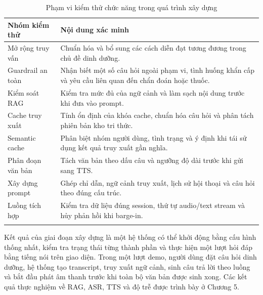 \documentclass[a4paper,13pt,twoside]{report}
\begin{document}
\begingroup
\small
\renewcommand{\arraystretch}{1.05}
\setlength{\LTleft}{\fill}
\setlength{\LTright}{\fill}
\begin{longtable}{|p{4.0cm}|p{8.5cm}|}
    \hline
    \textbf{Nhóm kiểm thử} & \textbf{Nội dung xác minh}                                                                                 \\
    \hline
    Mở rộng truy vấn       & Chuẩn hóa và bổ sung các cách diễn đạt tương đương trong chủ đề dinh dưỡng.                                \\
    \hline
    Guardrail an toàn      & Nhận biết một số câu hỏi ngoài phạm vi, tình huống khẩn cấp và yêu cầu liên quan đến chẩn đoán hoặc thuốc. \\
    \hline
    Kiểm soát RAG          & Kiểm tra mức đủ của ngữ cảnh và làm sạch nội dung trước khi đưa vào prompt.                                \\
    \hline
    Cache truy xuất        & Tính ổn định của khóa cache, chuẩn hóa câu hỏi và phân tách phiên bản kho tri thức.                        \\
    \hline
    Semantic cache         & Phân biệt nhóm người dùng, tình trạng và ý định khi tái sử dụng kết quả truy xuất gần nghĩa.               \\
    \hline
    Phân đoạn văn bản      & Tách văn bản theo dấu câu và ngưỡng độ dài trước khi gửi sang TTS.                                         \\
    \hline
    Xây dựng prompt        & Ghép chỉ dẫn, ngữ cảnh truy xuất, lịch sử hội thoại và câu hỏi theo đúng cấu trúc.                         \\
    \hline
    Luồng tích hợp         & Kiểm tra dữ liệu đúng session, thứ tự audio/text stream và hủy phản hồi khi barge-in.                      \\
    \hline
    \caption{Phạm vi kiểm thử chức năng trong quá trình xây dựng}
    \label{tab:unit-test-scope}
\end{longtable}
\endgroup

Kết quả của giai đoạn xây dựng là một hệ thống có thể khởi động bằng cấu hình thống nhất, kiểm tra trạng thái từng thành phần và thực hiện một lượt hỏi đáp bằng tiếng nói trên giao diện. Trong một lượt demo, người dùng đặt câu hỏi dinh dưỡng, hệ thống tạo transcript, truy xuất ngữ cảnh, sinh câu trả lời theo luồng và bắt đầu phát âm thanh trước khi toàn bộ văn bản được sinh xong. Các kết quả thực nghiệm về RAG, ASR, TTS và độ trễ được trình bày ở Chương 5.
\end{document}
